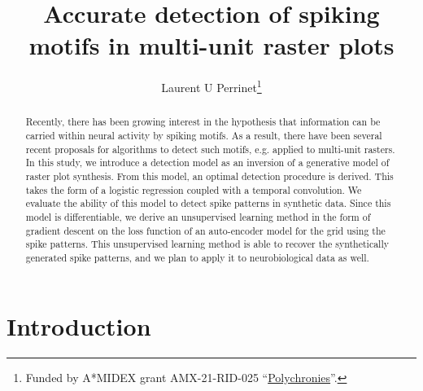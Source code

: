 \documentclass[runningheads]{llncs}
\begin{document}
\title{Accurate detection of spiking motifs in multi-unit raster plots}

\author{Laurent U Perrinet\thanks{Funded by A*MIDEX grant AMX-21-RID-025 ``\href{https://laurentperrinet.github.io/grant/polychronies/}{Polychronies}''.}}
%
%
%
\maketitle              %
%
\begin{abstract} Recently, there has been growing interest in the hypothesis that information can be carried within neural activity by spiking motifs. As a result, there have been several recent proposals for algorithms to detect such motifs, e.g. applied to multi-unit rasters. In this study, we introduce a detection model as an inversion of a generative model of raster plot synthesis. From this model, an optimal detection procedure is derived. This takes the form of a logistic regression coupled with a temporal convolution. We evaluate the ability of this model to detect spike patterns in synthetic data. Since this model is differentiable, we derive an unsupervised learning method in the form of gradient descent on the loss function of an auto-encoder model for the grid using the spike patterns. This unsupervised learning method is able to recover the synthetically generated spike patterns, and we plan to apply it to neurobiological data as well.
\end{abstract}

\section{Introduction}

\end{document}
